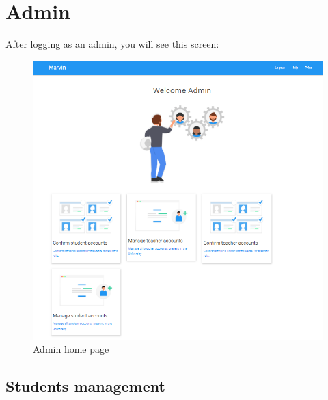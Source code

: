 \documentclass[ManualeUtente]{subfiles}
\begin{document}
\chapter{Admin}
After logging as an admin, you will see this screen:
\begin{figure}[H]
	\centering
	\includegraphics[width=1\linewidth]{image/Admin}
	\caption[Admin home page]{Admin home page}
	\label{fig:universityaddamin}
\end{figure}

\section{Students management}
\end{document}
